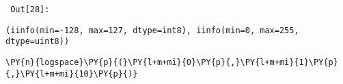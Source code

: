         {\par%
        \vspace{-1\smallerfontscale}%
        \noindent%
        \begin{minipage}{\cellleftmargin}%
    \hfill%
    {\smaller%
    \tt%
    \color{nbframe-out-prompt}%
    Out[28]:}%
    \hspace{\inputpadding}%
    \hspace{0em}%
    \hspace{3pt}%
    \end{minipage}%
        }%
    \begin{addmargin}[\cellleftmargin]{0em}%
    {\smaller%
    \vspace{-1\smallerfontscale}%
    
    
    
    \begin{verbatim}
(iinfo(min=-128, max=127, dtype=int8), iinfo(min=0, max=255, dtype=uint8))
    \end{verbatim}

    
}%
    \end{addmargin}%

{\par%
\vspace{-1\baselineskip}%
}%
\begin{notebookcell}[29]%
\begin{addmargin}[\cellleftmargin]{0em}%
{\smaller%
\par%
%
\vspace{-1\smallerfontscale}%
\begin{Verbatim}[commandchars=\\\{\}]
\PY{n}{logspace}\PY{p}{(}\PY{l+m+mi}{0}\PY{p}{,}\PY{l+m+mi}{1}\PY{p}{,}\PY{l+m+mi}{10}\PY{p}{)}
\end{Verbatim}
%
\par%
\vspace{-1\smallerfontscale}}%
\end{addmargin}
\end{notebookcell}

\par\vspace{1\smallerfontscale}%
    
